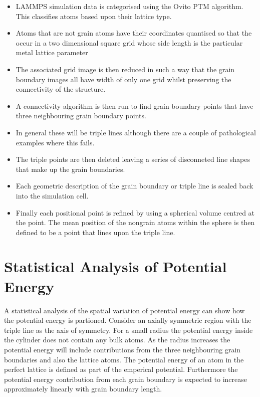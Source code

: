 \documentclass[12pt,a4paper]{book}
\begin{document}
\begin{itemize}

	\item LAMMPS simulation data is categorised using the Ovito PTM algorithm. This classifies atoms based upon their lattice type.
	\item Atoms that are not grain  atoms have their coordinates quantised so that the occur in a two dimensional square grid whose side length is the particular metal lattice parameter
	\item The associated grid image is then reduced in such a way that the grain boundary images all have width of only one grid whilst preserving the connectivity of the structure.
	\item A connectivity algorithm is then run to find grain boundary points that have three neighbouring grain boundary points.
	\item In general these will be triple lines although there are a couple of pathological examples where this fails.
	\item The triple points are then deleted leaving a series of disconneted line shapes that make up the grain boundaries.
	\item Each geometric description of the grain boundary or triple line is scaled back into the simulation cell. 
	\item Finally each positional point is refined by using a spherical volume centred at the point. The mean position of the nongrain atoms within the sphere is then defined to be a point that lines upon the triple line. 

\end{itemize} 


\section{Statistical Analysis of Potential Energy}

A statistical analysis of the spatial variation of potential energy can show how the potential energy is partioned. Consider an axially symmetric region with the triple line as the axis of symmetry. For a small radius the potential energy inside the cylinder does not contain any bulk atoms. As the radius increases the potential energy will include contributions from the three neighbouring grain boundaries and also the lattice atoms. The potential energy of an atom in the perfect lattice is defined as part of the emperical potential. Furthermore the potential energy contribution from each grain boundary is expected to increase approximately linearly with grain boundary length.
\end{document}
